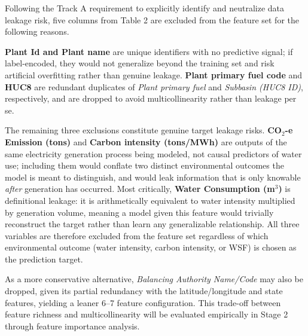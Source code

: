 \documentclass[conference]{IEEEtran}
\begin{document}
Following the Track A requirement to explicitly identify and neutralize data leakage risk, five columns from Table 2 are excluded from the feature set for the following reasons.

\textbf{Plant Id and Plant name} are unique identifiers with no predictive signal; if label-encoded, they would not generalize beyond the training set and risk artificial overfitting rather than genuine leakage. \textbf{Plant primary fuel code} and \textbf{HUC8} are redundant duplicates of \textit{Plant primary fuel} and \textit{Subbasin (HUC8 ID)}, respectively, and are dropped to avoid multicollinearity rather than leakage per se.

The remaining three exclusions constitute genuine target leakage risks. \textbf{CO$_2$-e Emission (tons)} and \textbf{Carbon intensity (tons/MWh)} are outputs of the same electricity generation process being modeled, not causal predictors of water use; including them would conflate two distinct environmental outcomes the model is meant to distinguish, and would leak information that is only knowable \textit{after} generation has occurred. Most critically, \textbf{Water Consumption (m$^3$)} is definitional leakage: it is arithmetically equivalent to water intensity multiplied by generation volume, meaning a model given this feature would trivially reconstruct the target rather than learn any generalizable relationship. All three variables are therefore excluded from the feature set regardless of which environmental outcome (water intensity, carbon intensity, or WSF) is chosen as the prediction target.

As a more conservative alternative, \textit{Balancing Authority Name/Code} may also be dropped, given its partial redundancy with the latitude/longitude and state features, yielding a leaner 6--7 feature configuration. This trade-off between feature richness and multicollinearity will be evaluated empirically in Stage 2 through feature importance analysis.

\nocite{*}


\end{document}
